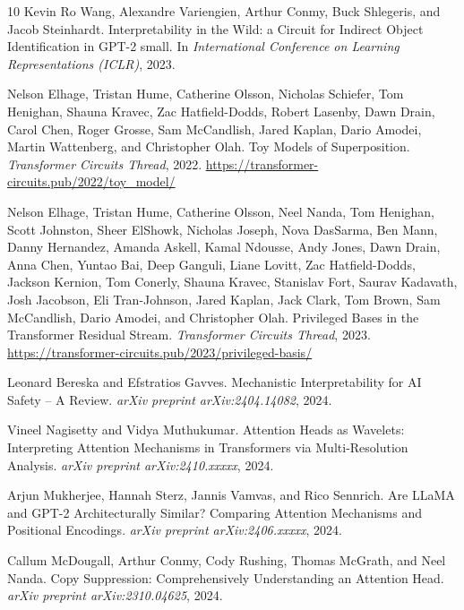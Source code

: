 \documentclass[11pt]{article}
\theoremstyle{definition}
\begin{document}
\begin{thebibliography}{10}
Kevin Ro Wang, Alexandre Variengien, Arthur Conmy, Buck Shlegeris, and Jacob Steinhardt.
\newblock Interpretability in the Wild: a Circuit for Indirect Object Identification in GPT-2 small.
\newblock In \emph{International Conference on Learning Representations (ICLR)}, 2023.

Nelson Elhage, Tristan Hume, Catherine Olsson, Nicholas Schiefer, Tom Henighan, Shauna Kravec, Zac Hatfield-Dodds, Robert Lasenby, Dawn Drain, Carol Chen, Roger Grosse, Sam McCandlish, Jared Kaplan, Dario Amodei, Martin Wattenberg, and Christopher Olah.
\newblock Toy Models of Superposition.
\newblock \emph{Transformer Circuits Thread}, 2022.
\newblock \url{https://transformer-circuits.pub/2022/toy_model/}

Nelson Elhage, Tristan Hume, Catherine Olsson, Neel Nanda, Tom Henighan, Scott Johnston, Sheer ElShowk, Nicholas Joseph, Nova DasSarma, Ben Mann, Danny Hernandez, Amanda Askell, Kamal Ndousse, Andy Jones, Dawn Drain, Anna Chen, Yuntao Bai, Deep Ganguli, Liane Lovitt, Zac Hatfield-Dodds, Jackson Kernion, Tom Conerly, Shauna Kravec, Stanislav Fort, Saurav Kadavath, Josh Jacobson, Eli Tran-Johnson, Jared Kaplan, Jack Clark, Tom Brown, Sam McCandlish, Dario Amodei, and Christopher Olah.
\newblock Privileged Bases in the Transformer Residual Stream.
\newblock \emph{Transformer Circuits Thread}, 2023.
\newblock \url{https://transformer-circuits.pub/2023/privileged-basis/}

Leonard Bereska and Efstratios Gavves.
\newblock Mechanistic Interpretability for AI Safety -- A Review.
\newblock \emph{arXiv preprint arXiv:2404.14082}, 2024.

Vineel Nagisetty and Vidya Muthukumar.
\newblock Attention Heads as Wavelets: Interpreting Attention Mechanisms in Transformers via Multi-Resolution Analysis.
\newblock \emph{arXiv preprint arXiv:2410.xxxxx}, 2024.

Arjun Mukherjee, Hannah Sterz, Jannis Vamvas, and Rico Sennrich.
\newblock Are LLaMA and GPT-2 Architecturally Similar? Comparing Attention Mechanisms and Positional Encodings.
\newblock \emph{arXiv preprint arXiv:2406.xxxxx}, 2024.

Callum McDougall, Arthur Conmy, Cody Rushing, Thomas McGrath, and Neel Nanda.
\newblock Copy Suppression: Comprehensively Understanding an Attention Head.
\newblock \emph{arXiv preprint arXiv:2310.04625}, 2024.


\end{thebibliography}
\end{document}
